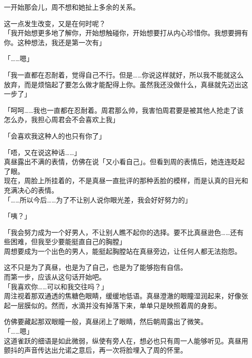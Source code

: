 一开始那会儿，周不想和她扯上多余的关系。

这一点发生改变，又是在何时呢？\\

「我开始想更多地了解你，开始想触碰你，开始想要打从内心珍惜你。我想要拥有你。这种想法，我还是第一次有」

「……嗯」

「我一直都在忍耐着，觉得自己不行。但是……你说这样就好，所以我不能就这么放弃，而是烦恼起了要怎么做才能配得上你。虽然我还没做什么，真昼就先迈出这一步了」

「呵呵……我也一直都在忍耐着。周君那么帅，我害怕周君要是被其他人抢走了该怎么办，我担心周君会不会喜欢上我」

「会喜欢我这种人的也只有你了」

「唔，又在说这种话……」\\

真昼露出不满的表情，仿佛在说「又小看自己」。但看到周的表情后，她连连眨起了眼。\\

现在，周脸上所挂着的，不是真昼一直批评的那种丢脸的模样，而是认真的目光和充满决心的表情。\\

「……所以今后……为了不让别人说你眼光差，我会好好努力的」

「咦？」

「我会努力成为一个好男人，不让别人瞧不起你的选择。要不比真昼逊色……还有些困难，但我至少要能挺直自己的胸膛」\\

周想要成为一个出色的男人，能挺起胸膛站在真昼旁边，让任何人都无法抱怨。

这不只是为了真昼，也是为了自己，也是为了能够抱有自信。\\

而第一步，应该从这句话开始吧。\\

「我喜欢你……可以和我交往吗？」\\

周注视着那双通透的焦糖色眼睛，缓缓地低语。真昼澄澈的眼瞳湿润起来，好像张起一层膜似的。然而，水滴并没有掉落下来，单单只是映照着周的身影。

仿佛要藏起那双眼瞳一般，真昼闭上了眼睛，然后朝周露出了微笑。\\

「……嗯」\\

这道雀跃的细语是如此微弱，纵使有旁人在，想必也只有周一人能够听见。真昼用颤抖的声音传达出允诺之意后，再一次将脸埋入了周的怀里。

